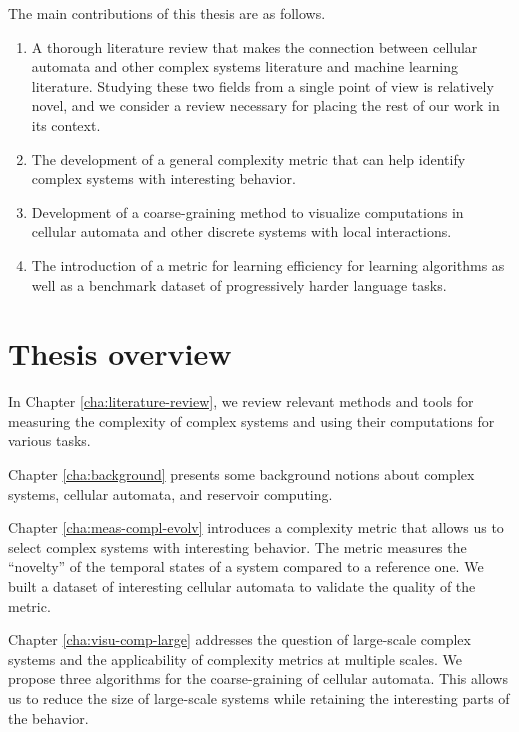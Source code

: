 The main contributions of this thesis are as follows.
\begin{enumerate}
  \item A thorough literature review that makes the connection between cellular
        automata and other complex systems literature and machine learning
        literature. Studying these two fields from a single point of view is
        relatively novel, and we consider a review necessary for placing the
        rest of our work in its context.

  \item The development of a general complexity metric that can help identify
        complex systems with interesting behavior.

  \item Development of a coarse-graining method to visualize computations
        in cellular automata and other discrete systems with local interactions.

  \item The introduction of a metric for learning efficiency for learning
        algorithms as well as a benchmark dataset of progressively harder
        language tasks.
\end{enumerate}

\section{Thesis overview}

In Chapter \ref{cha:literature-review}, we review relevant methods and tools for
measuring the complexity of complex systems and using their computations for
various tasks.

Chapter \ref{cha:background} presents some background notions about complex
systems, cellular automata, and reservoir computing.

Chapter \ref{cha:meas-compl-evolv} introduces a complexity metric that allows us 
to select complex systems with interesting behavior. The metric measures the
``novelty'' of the temporal states of a system compared to a reference one. We
built a dataset of interesting cellular automata to validate the quality of the
metric.

Chapter \ref{cha:visu-comp-large} addresses the question of large-scale complex
systems and the applicability of complexity metrics at multiple scales. We
propose three algorithms for the coarse-graining of cellular automata. This allows
us to reduce the size of large-scale systems while retaining the interesting parts
of the behavior.

